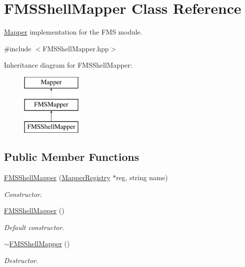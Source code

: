 \hypertarget{classFMSShellMapper}{
\section{FMSShellMapper Class Reference}
\label{classFMSShellMapper}
}


\hyperlink{classMapper}{Mapper} implementation for the FMS module.  




{\ttfamily \#include $<$FMSShellMapper.hpp$>$}

Inheritance diagram for FMSShellMapper:\begin{figure}[H]
\begin{center}
\leavevmode
\includegraphics[height=3.000000cm]{classFMSShellMapper}
\end{center}
\end{figure}
\subsection*{Public Member Functions}
\begin{DoxyCompactItemize}
\item 
\hyperlink{classFMSShellMapper_addcaff14893a54ea82fca3b0beb01779}{FMSShellMapper} (\hyperlink{classMapperRegistry}{MapperRegistry} $\ast$reg, string name)
\begin{DoxyCompactList}\small\item\em Constructor. \item\end{DoxyCompactList}\item 
\hypertarget{classFMSShellMapper_af70154182d56f548b95877881ee82e52}{
\hyperlink{classFMSShellMapper_af70154182d56f548b95877881ee82e52}{FMSShellMapper} ()}
\label{classFMSShellMapper_af70154182d56f548b95877881ee82e52}

\begin{DoxyCompactList}\small\item\em Default constructor. \item\end{DoxyCompactList}\item 
\hypertarget{classFMSShellMapper_a124865f42ef385c1cc83ba513f15c391}{
\hyperlink{classFMSShellMapper_a124865f42ef385c1cc83ba513f15c391}{$\sim$FMSShellMapper} ()}
\label{classFMSShellMapper_a124865f42ef385c1cc83ba513f15c391}

\begin{DoxyCompactList}\small\item\em Destructor. \item\end{DoxyCompactList}\end{DoxyCompactItemize}


